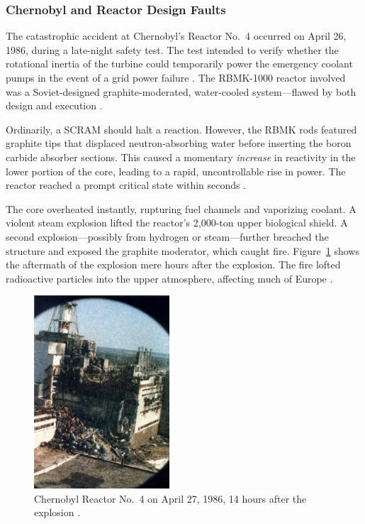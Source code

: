 \documentclass[12pt]{article}
\begin{document}
\subsubsection*{Chernobyl and Reactor Design Faults}

The catastrophic accident at Chernobyl's Reactor No.~4 occurred on April 26, 1986, during a late-night safety test. The test intended to verify whether the rotational inertia of the turbine could temporarily power the emergency coolant pumps in the event of a grid power failure \autocite{wna2023chernobyl}. The RBMK-1000 reactor involved was a Soviet-designed graphite-moderated, water-cooled system—flawed by both design and execution \autocite{iaea1992chernobyl, nrc_chernobyl}.

Ordinarily, a SCRAM should halt a reaction. However, the RBMK rods featured graphite tips that displaced neutron-absorbing water before inserting the boron carbide absorber sections. This caused a momentary \textit{increase} in reactivity in the lower portion of the core, leading to a rapid, uncontrollable rise in power. The reactor reached a prompt critical state within seconds \autocite{iaea1992chernobyl}.

The core overheated instantly, rupturing fuel channels and vaporizing coolant. A violent steam explosion lifted the reactor’s 2,000-ton upper biological shield. A second explosion—possibly from hydrogen or steam—further breached the structure and exposed the graphite moderator, which caught fire. Figure~\ref{fig:chernobylafter} shows the aftermath of the explosion mere hours after the explosion. The fire lofted radioactive particles into the upper atmosphere, affecting much of Europe \autocite{nrc_chernobyl}.

\begin{figure}[H]
  \centering
  \includegraphics[width=0.45\textwidth]{chernobylafter.jpg}
  \caption{Chernobyl Reactor No.~4 on April 27, 1986, 14 hours after the explosion \autocite{medvedev1991truth}.}
  \label{fig:chernobylafter}
\end{figure}
\end{document}

